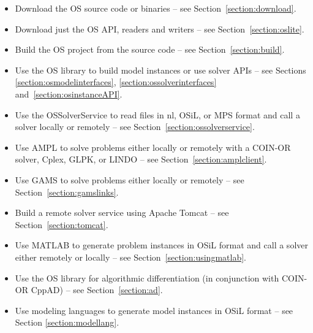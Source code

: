 \documentclass[11pt]{article}
\renewcommand{\_}{{\char"5F}}
\renewcommand{\{}{{\char"7B}}
\renewcommand{\}}{{\char"7D}}
\renewcommand{\^}{{\char"0D}}
\renewcommand{\'}{{\char"0D}}
\newif\ifknitro \knitrofalse    %
\begin{document}
\begin{itemize}
\item Download the OS source code or binaries -- see Section~\ref{section:download}.

\item Download just the OS API, readers and writers -- see Section~\ref{section:oslite}.

\item Build the OS project from the source code -- see Section~\ref{section:build}.

\item Use the OS library to build model instances or use solver APIs -- see Sections \ref{section:osmodelinterfaces},
\ref{section:ossolverinterfaces} and~\ref{section:osinstanceAPI}.

\item Use the OSSolverService to read files in nl, OSiL, 
or MPS format and call a solver locally or remotely -- see Section~\ref{section:ossolverservice}.


\item Use AMPL to solve problems either locally or remotely with a COIN-OR solver, Cplex, 
GLPK, \ifknitro Knitro\index{knitro}, \fi
or LINDO -- see Section~\ref{section:amplclient}.

\item Use GAMS to solve problems either locally or remotely -- see Section~\ref{section:gamslinks}.

\item Build a remote solver service using Apache Tomcat -- see Section~\ref{section:tomcat}.

\item Use MATLAB to generate problem instances in OSiL format and call a solver either remotely or locally
 -- see Section~\ref{section:usingmatlab}.

\item Use the OS library for algorithmic differentiation (in conjunction with 
COIN-OR CppAD) -- see Section~\ref{section:ad}.

\item Use modeling languages to generate model instances in OSiL format -- see Section \ref{section:modellang}.
\end{itemize}
\end{document}
